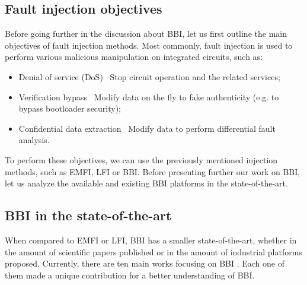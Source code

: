 
	\subsection{Fault injection objectives}
		Before going further in the discussion about BBI, let us first outline the main objectives of fault injection methods.
		Most commonly, fault injection is used to perform various malicious manipulation on integrated circuits, such as:
		\begin{itemize}
			\item Denial of service (DoS) \textrightarrow\ Stop circuit operation and the related services;
			\item Verification bypass \textrightarrow\ Modify data on the fly to fake authenticity (e.g. to bypass bootloader security);
			\item Confidential data extraction \textrightarrow\ Modify data to perform differential fault analysis.
		\end{itemize}
		To perform these objectives, we can use the previously mentioned injection methods, such as EMFI, LFI or BBI.
		Before presenting further our work on BBI, let us analyze the available and existing BBI platforms in the state-of-the-art.

	\subsection{BBI in the state-of-the-art}
%
		When compared to EMFI or LFI, BBI has a smaller state-of-the-art, whether in the amount of scientific papers published or in the amount of industrial platforms proposed.
		Currently, there are ten main works focusing on BBI \cite{bbiOrigin, bbiSecond, bbiThird, bbiColin,japbbi, japbbi2, mybbiCosade, mybbiFdtc2022, mybbifdtc2023, colinFdtc2023}.
		Each one of them made a unique contribution for a better understanding of BBI.

